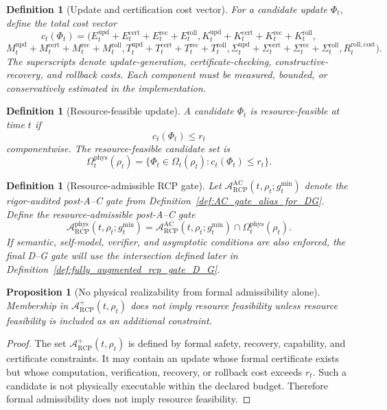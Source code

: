 \documentclass[11pt]{article}
\newtheorem{proposition}[theorem]{Proposition}
\newtheorem{definition}[theorem]{Definition}
\newcommand{\Acal}{\mathcal{A}}
\newcommand{\1}{\mathbf{1}}
\newcommand{\RCP}{\mathrm{RCP}}
\providecommand{\AC}{\mathrm{AC}}
\providecommand{\phys}{\mathrm{phys}}
\begin{document}
\begin{definition}[Update and certification cost vector]
\label{def:update_certification_cost_vector}
For a candidate update \(\Phi_t\), define the total cost vector
\[
c_t(\Phi_t)
=
\bigl(
E^{\mathrm{upd}}_t+E^{\mathrm{cert}}_t+E^{\mathrm{rec}}_t+E^{\mathrm{roll}}_t,
K^{\mathrm{upd}}_t+K^{\mathrm{cert}}_t+K^{\mathrm{rec}}_t+K^{\mathrm{roll}}_t,
\]
\[
M^{\mathrm{upd}}_t+M^{\mathrm{cert}}_t+M^{\mathrm{rec}}_t+M^{\mathrm{roll}}_t,
T^{\mathrm{upd}}_t+T^{\mathrm{cert}}_t+T^{\mathrm{rec}}_t+T^{\mathrm{roll}}_t,
\Sigma^{\mathrm{upd}}_t+\Sigma^{\mathrm{cert}}_t+\Sigma^{\mathrm{rec}}_t+\Sigma^{\mathrm{roll}}_t,
R^{\mathrm{roll,cost}}_t
\bigr).
\]
The superscripts denote update-generation, certificate-checking, constructive-recovery, and rollback costs.  Each component must be measured, bounded, or conservatively estimated in the implementation.
\end{definition}

\begin{definition}[Resource-feasible update]
\label{def:resource_feasible_update}
A candidate \(\Phi_t\) is resource-feasible at time \(t\) if
\[
c_t(\Phi_t)\le r_t
\]
componentwise.  The resource-feasible candidate set is
\[
\Omega_t^{\phys}(\rho_t)
=
\{\Phi_t\in\Omega_t(\rho_t):c_t(\Phi_t)\le r_t\}.
\]
\end{definition}

\begin{definition}[Resource-admissible RCP gate]
\label{def:resource_admissible_rcp_gate}
Let \(\Acal_{\RCP}^{\AC}(t,\rho_t;g_t^{\min})\) denote the rigor-audited post-A--C gate from Definition~\ref{def:AC_gate_alias_for_DG}.  Define the resource-admissible post-A--C gate
\[
\Acal_{\RCP}^{\phys}(t,\rho_t;g_t^{\min})
=
\Acal_{\RCP}^{\AC}(t,\rho_t;g_t^{\min})\cap\Omega_t^{\phys}(\rho_t).
\]
If semantic, self-model, verifier, and asymptotic conditions are also enforced, the final D--G gate will use the intersection defined later in Definition~\ref{def:fully_augmented_rcp_gate_D_G}.
\end{definition}

\begin{proposition}[No physical realizability from formal admissibility alone]
\label{prop:no_physical_realizability_from_formal_admissibility}
Membership in \(\Acal_{\RCP}^{+}(t,\rho_t)\) does not imply resource feasibility unless resource feasibility is included as an additional constraint.
\end{proposition}

\begin{proof}
The set \(\Acal_{\RCP}^{+}(t,\rho_t)\) is defined by formal safety, recovery, capability, and certificate constraints.  It may contain an update whose formal certificate exists but whose computation, verification, recovery, or rollback cost exceeds \(r_t\).  Such a candidate is not physically executable within the declared budget.  Therefore formal admissibility does not imply resource feasibility.
\end{proof}
\end{document}

